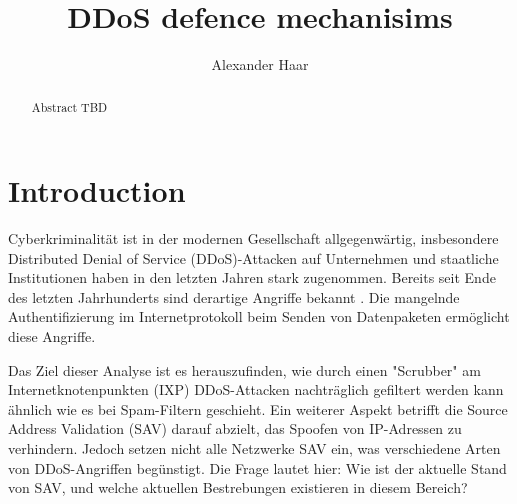 \documentclass[sigplan,screen]{acmart}
\begin{document}
\title{DDoS defence mechanisims}

\author{Alexander Haar}

\begin{abstract}
  Abstract TBD
\end{abstract}



\maketitle

\section{Introduction}
Cyberkriminalität ist in der modernen Gesellschaft allgegenwärtig, insbesondere Distributed Denial of Service (DDoS)-Attacken auf Unternehmen und staatliche Institutionen haben in den letzten Jahren stark zugenommen. Bereits seit Ende des letzten Jahrhunderts sind derartige Angriffe bekannt \cite{manrs01}. Die mangelnde Authentifizierung im Internetprotokoll beim Senden von Datenpaketen ermöglicht diese Angriffe. 


Das Ziel dieser Analyse ist es herauszufinden, wie durch einen "Scrubber" am Internetknotenpunkten (IXP) DDoS-Attacken nachträglich gefiltert werden kann ähnlich wie es bei Spam-Filtern geschieht. Ein weiterer Aspekt betrifft die Source Address Validation (SAV) darauf abzielt, das Spoofen von IP-Adressen zu verhindern. Jedoch setzen nicht alle Netzwerke SAV ein, was verschiedene Arten von DDoS-Angriffen begünstigt. Die Frage lautet hier: Wie ist der aktuelle Stand von SAV, und welche aktuellen Bestrebungen existieren in diesem Bereich?
\end{document}
